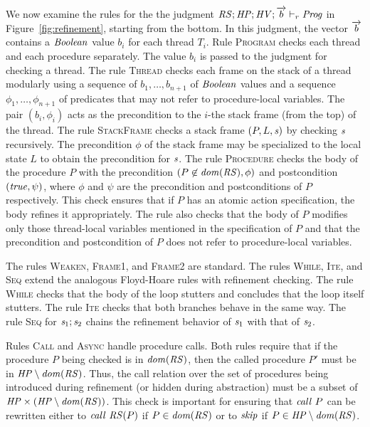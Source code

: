 We now examine the rules for the the judgment $\mathit{RS};\mathit{HP};\mathit{HV};\overrightarrow{b} \vdash_r \mathit{Prog}$ in Figure~\ref{fig:refinement},
starting from the bottom.
In this judgment, the vector $\overrightarrow{b}$ contains a $\mathit{Boolean}$ value $b_i$ for each thread $T_i$.
Rule \textsc{Program} checks each thread and each procedure separately.
The value $b_i$ is passed to the judgment for checking a thread.
The rule \textsc{Thread} checks each frame on the stack of a thread modularly using a sequence of $b_1,\ldots,b_{n+1}$ of 
$\mathit{Boolean}$ values and a sequence $\phi_1,\ldots,\phi_{n+1}$ of predicates that may not refer to procedure-local variables.
The pair $(b_i,\phi_i)$ acts as the precondition to the $i$-the stack frame (from the top) of the thread.
The rule \textsc{StackFrame} checks a stack frame $(P, L, \mathit{s})$ by checking $\mathit{s}$ recursively.
The precondition $\phi$ of the stack frame may be specialized to the local state $L$ to obtain the precondition for $\mathit{s}$.
The rule \textsc{Procedure} checks the body of the procedure $P$ with
the precondition $(P \not\in \mathit{dom}(\mathit{RS}),\phi)$ and postcondition $(\mathit{true},\psi)$,
where $\phi$ and $\psi$ are the precondition and postconditions of $P$ respectively.
This check ensures that if $P$ has an atomic action specification, the body refines it appropriately.
The rule also checks that the body of $P$ modifies only those thread-local variables mentioned in the 
specification of $P$ and that the precondition and postcondition of $P$ does not refer to procedure-local variables.

The rules \textsc{Weaken}, \textsc{Frame1}, and \textsc{Frame2} are standard.
The rules \textsc{While}, \textsc{Ite}, and \textsc{Seq} extend the analogous Floyd-Hoare rules with refinement checking.
The rule \textsc{While} checks that the body of the loop stutters and concludes that the loop itself stutters.
The rule \textsc{Ite} checks that both branches behave in the same way.
The rule \textsc{Seq} for $\mathit{s}_1;\mathit{s}_2$ chains the refinement behavior of $\mathit{s}_1$ with that of $\mathit{s}_2$.

Rules \textsc{Call} and \textsc{Async} handle procedure calls.
Both rules require that if the procedure $P$ being checked is in $\mathit{dom}(\mathit{RS})$,
then the called procedure $P'$ must be in $\mathit{HP} \setminus \mathit{dom}(\mathit{RS})$.
Thus, the call relation over the set of procedures being introduced during refinement (or hidden during abstraction) 
must be a subset of $\mathit{HP} \times (\mathit{HP}\setminus\mathit{dom}(\mathit{RS}))$.
This check is important for ensuring that $\mathit{call}\ P$ can be rewritten either to $\mathit{call}\ \mathit{RS}(P)$ if $P \in \mathit{dom}(\mathit{RS})$ 
or to $\mathit{skip}$ if $P \in \mathit{HP} \setminus \mathit{dom}(\mathit{RS})$.

